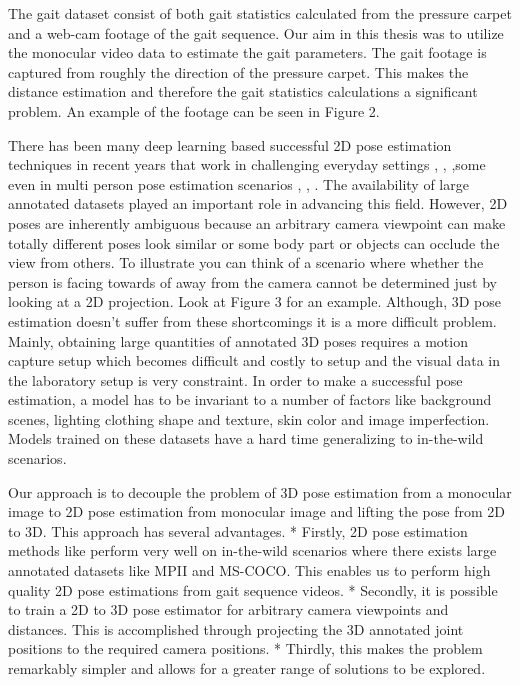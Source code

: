 The gait dataset consist of both gait statistics calculated from the pressure carpet and a web-cam footage of the gait sequence. Our aim in this thesis was to utilize the monocular video data to estimate the gait parameters. The gait footage is captured from roughly the direction of the pressure carpet. This makes the distance estimation and therefore the gait statistics calculations a significant problem. An example of the footage can be seen in Figure 2.

There has been many deep learning based successful 2D pose estimation techniques in recent years that work in challenging everyday settings \parencite{newell2016stacked}, \parencite{chu2017multi}, \parencite{chou2017self} ,some even in multi person pose estimation scenarios \parencite{cao2016realtime}, \parencite{iqbal2017posetrack}, \parencite{insafutdinov2017arttrack}. The availability of large annotated datasets played an important role in advancing this field. However, 2D poses are inherently ambiguous because an arbitrary camera viewpoint can make totally different poses look similar or some body part or objects can occlude the view from others. To illustrate you can think of a scenario where whether the person is facing towards of away from the camera cannot be determined just by looking at a 2D projection. Look at Figure 3 for an example. Although, 3D pose estimation doesn't suffer from these shortcomings it is a more difficult problem. Mainly, obtaining large quantities of annotated 3D poses requires a motion capture setup which becomes difficult and costly to setup and the visual data in the laboratory setup is very constraint. In order to make a successful pose estimation, a model has to be invariant to a number of factors like background scenes, lighting clothing shape and texture, skin color and image imperfection. Models trained on these datasets have a hard time generalizing to in-the-wild scenarios.

Our approach is to decouple the problem of 3D pose estimation from a monocular image to 2D pose estimation from monocular image and lifting the pose from 2D to 3D. This approach has several advantages. 
* Firstly, 2D pose estimation methods like \parencite{cao2016realtime} perform very well on in-the-wild scenarios where there exists large annotated datasets like MPII and MS-COCO. This enables us to perform high quality 2D pose estimations from gait sequence videos.
* Secondly, it is possible to train a 2D to 3D pose estimator for arbitrary camera viewpoints and distances. This is accomplished through projecting the 3D annotated joint positions to the required camera positions.
* Thirdly, this makes the problem remarkably simpler and allows for a greater range of solutions to be explored.

